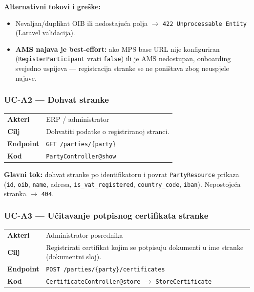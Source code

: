 \documentclass[11pt,a4paper]{article}
\begin{document}
\textbf{Alternativni tokovi i greške:}
\begin{itemize}[nosep]
  \item Nevaljan/duplikat OIB ili nedostajuća polja $\rightarrow$ \texttt{422 Unprocessable Entity} (Laravel validacija).
  \item \textbf{AMS najava je best-effort:} ako MPS base URL nije konfiguriran (\texttt{RegisterParticipant}
        vrati \texttt{false}) ili je AMS nedostupan, onboarding svejedno uspijeva — registracija
        stranke se ne poništava zbog neuspjele najave.
\end{itemize}

\subsubsection{UC-A2 — Dohvat stranke}

\begin{tabularx}{\textwidth}{@{}lY@{}}
\toprule
\textbf{Akteri} & ERP / administrator \\
\textbf{Cilj} & Dohvatiti podatke o registriranoj stranci. \\
\textbf{Endpoint} & \texttt{GET /parties/\{party\}} \\
\textbf{Kod} & \texttt{PartyController@show} \\
\bottomrule
\end{tabularx}

\textbf{Glavni tok:} dohvat stranke po identifikatoru i povrat \texttt{PartyResource} prikaza
(\texttt{id}, \texttt{oib}, \texttt{name}, adresa, \texttt{is\_vat\_registered}, \texttt{country\_code}, \texttt{iban}).
Nepostojeća stranka $\rightarrow$ \texttt{404}.

\subsubsection{UC-A3 — Učitavanje potpisnog certifikata stranke}

\begin{tabularx}{\textwidth}{@{}lY@{}}
\toprule
\textbf{Akteri} & Administrator posrednika \\
\textbf{Cilj} & Registrirati certifikat kojim se potpisuju dokumenti u ime stranke (dokumentni sloj). \\
\textbf{Endpoint} & \texttt{POST /parties/\{party\}/certificates} \\
\textbf{Kod} & \texttt{CertificateController@store} $\rightarrow$ \texttt{StoreCertificate} \\
\bottomrule
\end{tabularx}
\end{document}
